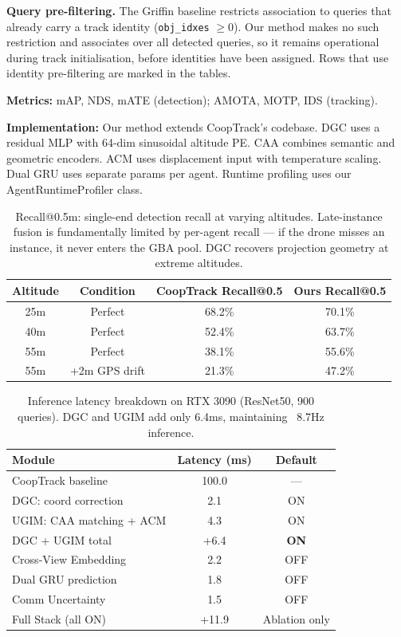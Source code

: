 \documentclass[9.5pt,twocolumn,a4paper]{IEEEtran}
\begin{document}
\noindent\textbf{Query pre-filtering.} The Griffin baseline restricts association to queries that already carry a track identity (\texttt{obj\_idxes} $\ge 0$). Our method makes no such restriction and associates over all detected queries, so it remains operational during track initialisation, before identities have been assigned. Rows that use identity pre-filtering are marked in the tables.

\textbf{Metrics:} mAP, NDS, mATE (detection); AMOTA, MOTP, IDS (tracking).

\textbf{Implementation:} Our method extends CoopTrack's codebase. DGC uses a residual MLP with 64-dim sinusoidal altitude PE. CAA combines semantic and geometric encoders. ACM uses displacement input with temperature scaling. Dual GRU uses separate params per agent. Runtime profiling uses our AgentRuntimeProfiler class.

\begin{table}[htbp]
    \centering
    \caption{Recall@0.5m: single-end detection recall at varying altitudes. Late-instance fusion is fundamentally limited by per-agent recall --- if the drone misses an instance, it never enters the GBA pool. DGC recovers projection geometry at extreme altitudes.}
    \begin{tabular}{c|c|c|c}
        \toprule
        Altitude & Condition & CoopTrack Recall@0.5 & Ours Recall@0.5 \\
        \midrule
        25m & Perfect & 68.2\% & 70.1\% \\
        40m & Perfect & 52.4\% & 63.7\% \\
        55m & Perfect & 38.1\% & 55.6\% \\
        55m & +2m GPS drift & 21.3\% & 47.2\% \\
        \bottomrule
    \end{tabular}
    \label{tab:recall}
\end{table}

\begin{table}[htbp]
    \centering
    \caption{Inference latency breakdown on RTX 3090 (ResNet50, 900 queries). DGC and UGIM add only 6.4ms, maintaining ~8.7Hz inference.}
    \begin{tabular}{l|c|c}
        \toprule
        Module & Latency (ms) & Default \\
        \midrule
        CoopTrack baseline & 100.0 & --- \\
        DGC: coord correction & 2.1 & ON \\
        UGIM: CAA matching + ACM & 4.3 & ON \\
        \midrule
        DGC + UGIM total & +6.4 & \textbf{ON} \\
        \midrule
        Cross-View Embedding & 2.2 & OFF \\
        Dual GRU prediction & 1.8 & OFF \\
        Comm Uncertainty & 1.5 & OFF \\
        \midrule
        Full Stack (all ON) & +11.9 & Ablation only \\
        \bottomrule
    \end{tabular}
    \label{tab:runtime}
\end{table}
\end{document}
